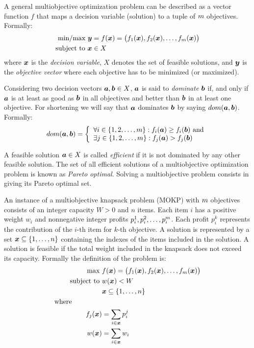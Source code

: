 A general multiobjective optimization problem can be described as a vector
function $f$ that maps a decision variable (solution) to a tuple
of $m$ objectives.
Formally:
\begin{align*}
  \text{min/max} ~ \boldsymbol{y} &= f(\boldsymbol{x}) =
    \big(f_1(\boldsymbol{x})
    ,f_2(\boldsymbol{x})
    ,\ldots
    ,f_{m}(\boldsymbol{x})\big) \\
  \text{subject to} ~ \boldsymbol{x} & \in X
\end{align*}
where $\boldsymbol{x}$ is the \emph{decision variable}, $X$ denotes the set
of feasible solutions, and $\boldsymbol{y}$ is the \emph{objective vector} where
each objective has to be minimized (or maximized).

Considering two decision vectors $\boldsymbol{a}, \boldsymbol{b} \in X$, $\boldsymbol{a}$ is said to
\emph{dominate} $\boldsymbol{b}$ if, and only if $\boldsymbol{a}$ is at least as good as $\boldsymbol{b}$
in all objectives and better than $\boldsymbol{b}$ in at least one objective.
For shortening we will say that $\boldsymbol{a}$ dominates $\boldsymbol{b}$ by saying $dom(\boldsymbol{a}, \boldsymbol{b})$.
Formally:
\begin{displaymath}
    dom(\boldsymbol{a}, \boldsymbol{b}) = \left\{
      \begin{array}{l}
          \forall i \in \{1, 2, \ldots, m\}: f_i(\boldsymbol{a}) \geq f_i(\boldsymbol{b}) ~\text{and}\\
          \exists j \in \{1, 2, \ldots, m\}: f_j(\boldsymbol{a}) > f_j(\boldsymbol{b})
  \end{array} \right.
\end{displaymath}

A feasible solution $\boldsymbol{a} \in X$ is called \emph{efficient} %
if it is not dominated by any other feasible solution.
The set of all efficient solutions of a multiobjective optimization problem is
known as \emph{Pareto optimal}.
Solving a multiobjective problem consists in giving its Pareto optimal set.

An instance of a multiobjective knapsack problem (MOKP) with $m$
objectives consists of an integer capacity $W > 0$ and $n$ items.
Each item $i$ has a positive weight $w_i$ and nonnegative integer
profits $p_i^1, p_i^2, \ldots, p_{i}^{m}$.
Each profit $p_i^k$ represents the contribution of the $i$-th item for $k$-th objective.
A solution is represented by a set $\boldsymbol{x} \subseteq \{1, \ldots, n\}$
containing the indexes of the items included in the solution.
A solution is feasible if the total weight included in the knapsack does
not exceed its capacity.
Formally the definition of the problem is:
\begin{align*}
  \text{max   } & f(\boldsymbol{x}) =
    \big(f_1(\boldsymbol{x}) ,f_2(\boldsymbol{x}) ,\ldots ,f_{m}(\boldsymbol{x})\big) \\
  \text{subject to   } & w(\boldsymbol{x}) < W \\
  & \boldsymbol{x} \subseteq \{1, \ldots, n\}\\
  \text{where} \phantom{mmmmm} \\
  f_j(\boldsymbol{x}) &= \sum_{i \in \boldsymbol{x}} p^j_i\\
  w(\boldsymbol{x}) &= \sum_{i \in \boldsymbol{x}} w_i
\end{align*}

